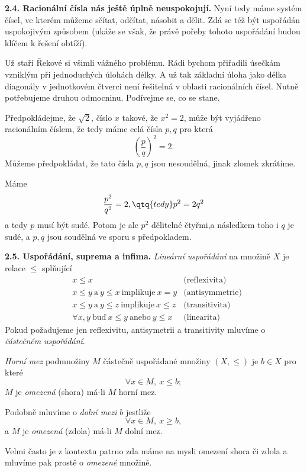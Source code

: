 \documentclass[12pt]{article}
\begin{document}
 \bigskip
 
 {\bf 2.4. Racionální čísla nás ještě úplně neuspokojují.} Nyní tedy máme systém čísel, ve kterém můžeme sčítat, odčítat, násobit a dělit. Zdá se též být uspořádán uspokojivým způsobem (ukáže se však, že právě pořeby tohoto uspořádání budou klíčem k řešení obtíží).
 
Už staří Řekové si všimli vážného problému. Rádi bychom přiřadili  úsečkám vzniklým při jednoduchých úlohách délky.
A už tak základní úloha jako délka diagonály v jednotkovém čtverci není řešitelná v oblasti racionálních čísel. Nutně potřebujeme druhou odmocninu. Podívejme se, co se stane.

 Předpokládejme, že $\sqrt 2$, číslo  $x$ takové, že $x^2=2$, může být vyjádřeno racionálním číslem, že tedy máme celá čísla $p,q$ pro která
$$
 \left(\frac pq\right)^2=2.
 $$
Můžeme předpokládat, že tato čísla $p,q$ jsou nesoudělná, jinak zlomek zkrátíme.  
 
 Máme
 $$ 
 \frac{p^2}{q^2}=2,\qtq{tedy} p^2=2q^2
 $$
 a tedy $p$ musí být sudé. Potom je ale $p^2$ dělitelné čtyřmi,a následkem toho i $q$ je sudé, a  $p,q$ jsou soudělná ve sporu s předpokladem.
 
 \bigskip
 
 {\bf 2.5. Uspořádání, suprema a infima.}  {\em Lineární uspořádání} na množině $X$ je relace
 $\leq$ splňující
 $$
 \begin{aligned}
  &x\leq x &\text{(reflexivita)} \\
   &x\leq y\ \text{a}\ y\leq x\ \text{implikuje} \ x=y &\text{(antisymmetrie)}\\
 &x\leq y \ \text{a}\ y\leq z\ \text{implikuje}\ x\leq z &\text{(transitivita)}\\
 &\forall x,y \ \text{buď}\ x\leq y\ \text{anebo}\ y\leq x &\text{(linearita)}
 \end{aligned}
 $$ 
 Pokud požadujeme jen reflexivitu, antisymetrii a transitivity mluvíme o  {\em částečném uspořádání}.
 
 \medskip
 
 {\em Horní mez} podmnožiny $M$ částečně uspořádané množiny $(X,\leq)$ je   $b\in X$ pro které
$$
 \forall x\in M,\  x\leq b;
 $$
 $M$ je  {\em omezená} (shora) má-li $M$ horní mez.
  
Podobně mluvíme o  {\em dolní mezi} $b$ jestliže
 $$
 \forall x\in M,\  x\geq b,
 $$
a $M$ je {\em omezená} (zdola) má-li $M$ dolní mez.

Velmi často je z kontextu patrno zda máme na mysli omezení shora či zdola a mluvíme pak prostě o {\em omezené} množině.
\end{document}
